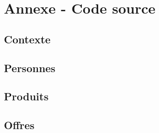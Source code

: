 \documentclass{article}
\newcommand{\code}[1]{}
\begin{document}
 \clearpage
 
\section*{Annexe - Code source}

\subsection*{Contexte}
\code{Contexte}
\code{Alerte}
\code{Panier}

\subsection*{Personnes}
\code{Personne}
\code{NomStatut}
\code{Statut}
\code{Adherent}
\code{Employe}
\code{Visiteur}

\subsection*{Produits}
\code{Produit}
\code{NomCategorie}
\code{Culture}
\code{Hightech}
\code{Livres}
\code{Spectacles}
\code{Tablette}

\subsection*{Offres}
\code{Offre}
\code{OffreEmploye}
\code{OffreFidelite}
\code{OffreFlash}
\code{OffreProduit}
\end{document}
